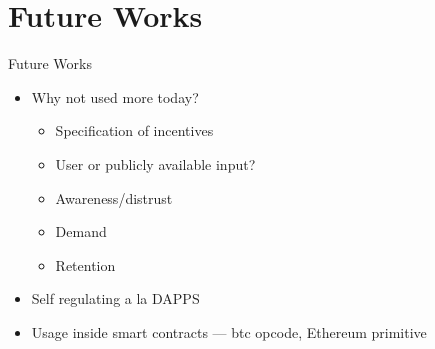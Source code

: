\section{Future Works}

\begin{frame}{Future Works}
    \begin{itemize}
        \item Why not used more today?
            \begin{itemize}
                \item Specification of incentives
                \item User or publicly available input?
                \item Awareness/distrust
                \item Demand
                \item Retention
            \end{itemize}
        \item Self regulating a la DAPPS
        \item Usage inside smart contracts --- btc opcode, Ethereum primitive
    \end{itemize}
\end{frame}
